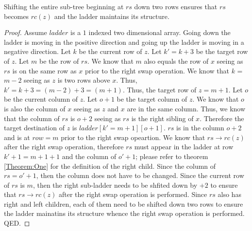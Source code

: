 \begin{lemma}
	Shifting the entire sub-tree beginning at $rs$ down 
two rows ensures that $rs$ becomes $rc(z)$ and the ladder maintains its structure.
\end{lemma}
\begin{proof}
	Assume $ladder$ is a $1$ indexed two dimensional array. Going down the ladder is moving in the positive 
	direction and going up the ladder is moving in a negative direction. 
	Let $k$ be the current row of $z$. Let $k'=k+3$ be the target row of $z$. Let $m$ be the row of $rs$.
	We know that $m$ also equals the row of $x$ seeing as $rs$ is on the same row as $x$ prior to the 
	right swap operation. We know that $k$ = $m-2$ seeing as $z$ is two rows above $x$. Thus, 
	$k'=k+3=(m-2)+3=(m+1)$. Thus, the target row of $z=m+1$. Let $o$ be the current column of $z$.
	Let $o+1$ be the target column of $z$. We know that $o$ is 
	also the column of $x$ seeing as $z$ and $x$ are in the same column. 
	Thus, we know that the column of $rs$ is $o+2$ seeing as $rs$ is the right sibling  
	of $x$. Therefore the target destination of $z$ is $ladder[k'=m+1][o+1]$. 
	$rs$ is in the column $o+2$ and is at $row=m$ prior to the right swap opeartion. 
	We know that $rs \rightarrow rc(z)$ after the right swap operation, therefore $rs$ 
	must appear in the ladder at row $k'+1=m+1+1$ and the column of $o'+1$; please refer to theorem \ref{Theorem:One}
	for the definition of the right child. Since the column of $rs=o'+1$, then the column does not have to be changed.
	Since the current row of $rs$ is $m$, then the right sub-ladder needs to be shfited down by $+2$ to ensure 
	that $rs \rightarrow rc(z)$ after the right swap operation is performed. Since $rs$ also has right and left children, 
	each of them need to be shifted down two rows to ensure the ladder mainatins its structure whence the right swap 
	operation is performed. QED. 

\end{proof}

